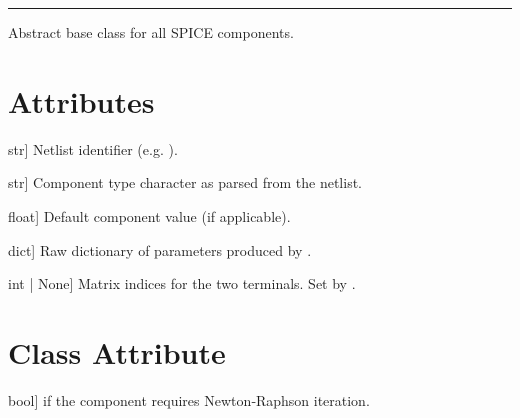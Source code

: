 \documentclass[letterpaper,10pt,english]{sphinxmanual}
\begin{document}
\bigskip\hrule\bigskip


\begin{fulllineitems}
\label{\detokenize{component_base:Component}}
\pysigstartsignatures
\pysiglinewithargsret
{}
{\sphinxparamcomma {}}
{}
\pysigstopsignatures
\sphinxAtStartPar
Abstract base class for all SPICE components.


\section{Attributes}
\label{\detokenize{component_base:attributes}}\begin{description}
\sphinxlineitem{name}{[}str{]}
\sphinxAtStartPar
Netlist identifier (e.g. ).

\sphinxlineitem{type}{[}str{]}
\sphinxAtStartPar
Component type character as parsed from the netlist.

\sphinxlineitem{value}{[}float{]}
\sphinxAtStartPar
Default component value (if applicable).

\sphinxlineitem{data}{[}dict{]}
\sphinxAtStartPar
Raw dictionary of parameters produced by {\hyperref[\detokenize{parser:NetlistParser}]{}}.

\sphinxlineitem{idx\_1, idx\_2}{[}int | None{]}
\sphinxAtStartPar
Matrix indices for the two terminals.  Set by .

\end{description}


\section{Class Attribute}
\label{\detokenize{component_base:class-attribute}}\begin{description}
\sphinxlineitem{IS\_NONLINEAR}{[}bool{]}
\sphinxAtStartPar
{} if the component requires Newton‑Raphson iteration.

\end{description}

\end{fulllineitems}
\end{document}

